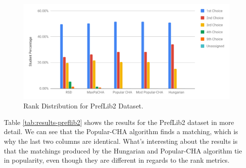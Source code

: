 \begin{figure}[h!]
  \centering
    \includegraphics[width=0.9\linewidth]{assets/plots/preflib2-ranks.pdf}
    \caption{Rank Distribution for PrefLib2 Dataset.}
    \label{fig:preflib2-rank-distribution}
\end{figure}

Table \ref{tab:results-preflib2} shows the results for the PrefLib2 dataset in more detail. We can see that the Popular-CHA algorithm finds a matching, which is why the last two columns are identical. What's interesting about the results is that the matchings produced by the Hungarian and Popular-CHA algorithm tie in popularity, even though they are different in regards to the rank metrics. 

\begin{table}[h!]
  \centering
  \caption{Summary of the Results for PrefLib2}
  \label{tab:results-preflib2}
\end{table}

